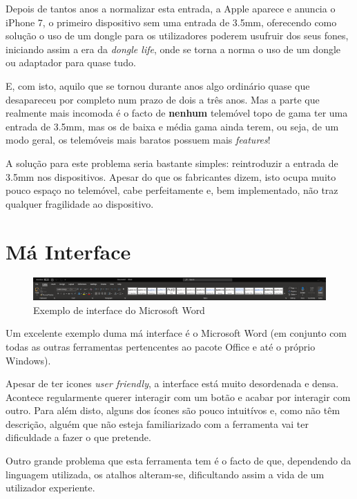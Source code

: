 \documentclass[11pt]{article}
\begin{document}
	Depois de tantos anos a normalizar esta entrada, a Apple aparece e anuncia o iPhone 7, o primeiro dispositivo sem uma entrada de 3.5mm, oferecendo como solução o uso de um dongle para os utilizadores poderem usufruir dos seus fones, iniciando assim a era da \textit{dongle life}, onde se torna a norma o uso de um dongle ou adaptador para quase tudo.
	
	E, com isto, aquilo que se tornou durante anos algo ordinário quase que desapareceu por completo num prazo de dois a três anos. Mas a parte que realmente mais incomoda é o facto de \textbf{nenhum} telemóvel topo de gama ter uma entrada de 3.5mm, mas os de baixa e média gama ainda terem, ou seja, de um modo geral, os telemóveis mais baratos possuem mais \textit{features}!
	
	A solução para este problema seria bastante simples: reintroduzir a entrada de 3.5mm nos dispositivos. Apesar do que os fabricantes dizem, isto ocupa muito pouco espaço no telemóvel, cabe perfeitamente e, bem implementado, não traz qualquer fragilidade ao dispositivo.
	
	\large
	\section{Má Interface}
	
	\normalsize
	\begin{figure}[h]
		\includegraphics[width=1\textwidth]{word}
		\centering
		\caption{Exemplo de interface do Microsoft Word}
		\label{fig:word}
	\end{figure}
	
	Um excelente exemplo duma má interface é o Microsoft Word (em conjunto com todas as outras ferramentas pertencentes ao pacote Office e até o próprio Windows).
	
	Apesar de ter icones \textit{user friendly}, a interface está muito desordenada e densa. Acontece regularmente querer interagir com um botão e acabar por interagir com outro. Para além disto, alguns dos ícones são pouco intuitívos e, como não têm descrição, alguém que não esteja familiarizado com a ferramenta vai ter dificuldade a fazer o que pretende.
	
	Outro grande problema que esta ferramenta tem é o facto de que, dependendo da linguagem utilizada, os atalhos alteram-se, dificultando assim a vida de um utilizador experiente.
	
\end{document}
